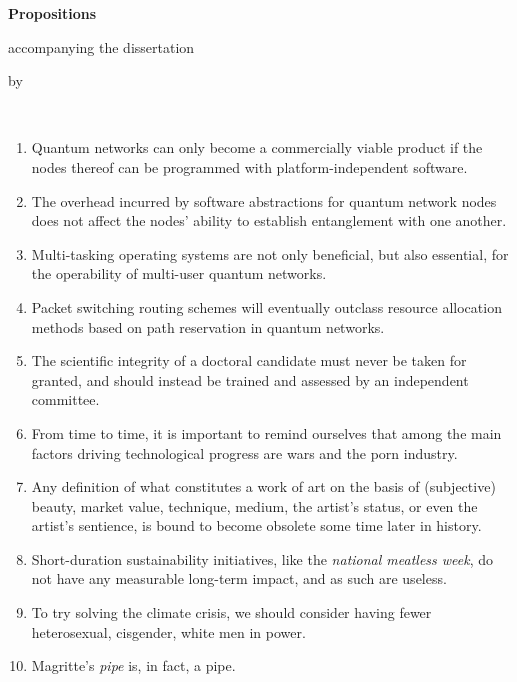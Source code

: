 \begin{center}

{\Large\titlefont\bfseries Propositions}

\medskip

accompanying the dissertation

\medskip

{\makeatletter
\titlestyle\bfseries\large\@title
\makeatother}

{\makeatletter
\ifx\@subtitle\undefined\else
\titlefont\titleshape\@subtitle
\fi
\makeatother}

\medskip

by

\medskip

\makeatletter
{\large\titlefont\bfseries\@firstname\ {\titleshape\@lastname}}
\makeatother

\end{center}

\bigskip

\begin{enumerate}[widest=10]
    \item Quantum networks can only become a commercially viable product if the nodes thereof can be
          programmed with platform-independent software.
    \item The overhead incurred by software abstractions for quantum network nodes does not affect
          the nodes' ability to establish entanglement with one another.
    \item Multi-tasking operating systems are not only beneficial, but also essential, for the
          operability of multi-user quantum networks.
    \item Packet switching routing schemes will eventually outclass resource allocation methods
          based on path reservation in quantum networks.
    \item The scientific integrity of a doctoral candidate must never be taken for granted, and
          should instead be trained and assessed by an independent committee.
    \item From time to time, it is important to remind ourselves that among the main factors driving
          technological progress are wars and the porn industry.
    \item Any definition of what constitutes a work of art on the basis of (subjective) beauty,
          market value, technique, medium, the artist's status, or even the artist's sentience, is
          bound to become obsolete some time later in history.
    \item Short-duration sustainability initiatives, like the \emph{national meatless week}, do not
          have any measurable long-term impact, and as such are useless.
    \item To try solving the climate crisis, we should consider having fewer heterosexual,
          cisgender, white men in power.
    \item Magritte's \emph{pipe} is, in fact, a pipe.
\end{enumerate}

